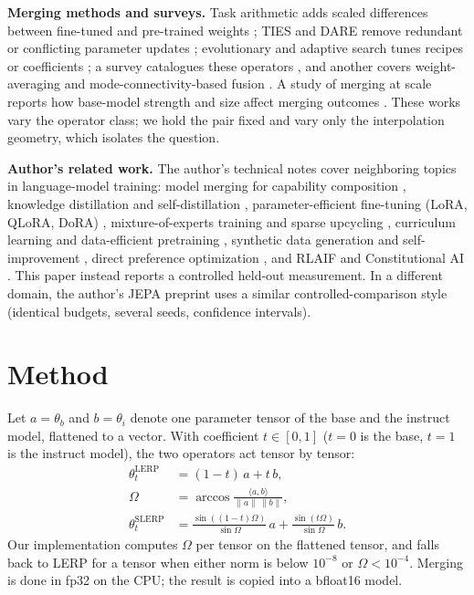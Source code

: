 \documentclass[conference]{IEEEtran}
\begin{document}
\textbf{Merging methods and surveys.} Task arithmetic adds scaled differences between fine-tuned and pre-trained weights \cite{ilharco2022editing}; TIES and DARE remove redundant or conflicting parameter updates \cite{yadav2023ties,yu2023dare}; evolutionary and adaptive search tunes recipes or coefficients \cite{akiba2024evolutionary}; a survey catalogues these operators \cite{yang2024survey}, and another covers weight-averaging and mode-connectivity-based fusion \cite{li2023fusion}. A study of merging at scale reports how base-model strength and size affect merging outcomes \cite{yadav2024matters}. These works vary the operator class; we hold the pair fixed and vary only the interpolation geometry, which isolates the question.

\textbf{Author's related work.} The author's technical notes cover neighboring topics in language-model training: model merging for capability composition \cite{santos2026modelmergingfo}, knowledge distillation and self-distillation \cite{santos2026knowledgedisti}, parameter-efficient fine-tuning (LoRA, QLoRA, DoRA) \cite{santos2026parametereffic}, mixture-of-experts training and sparse upcycling \cite{santos2026mixtureofexper}, curriculum learning and data-efficient pretraining \cite{santos2026curriculumlear}, synthetic data generation and self-improvement \cite{santos2026syntheticdatag}, direct preference optimization \cite{santos2026directpreferen}, and RLAIF and Constitutional AI \cite{santos2026rlaifandconsti}. This paper instead reports a controlled held-out measurement. In a different domain, the author's JEPA preprint \cite{santos2026collapseresist} uses a similar controlled-comparison style (identical budgets, several seeds, confidence intervals).

\section{Method}
Let $a=\theta_b$ and $b=\theta_i$ denote one parameter tensor of the base and the instruct model, flattened to a vector. With coefficient $t\in[0,1]$ ($t=0$ is the base, $t=1$ is the instruct model), the two operators act tensor by tensor:
\begin{align}
\theta^{\mathrm{LERP}}_t &= (1-t)\,a+t\,b, \label{eq:lerp}\\
\Omega &= \arccos\frac{\langle a,b\rangle}{\lVert a\rVert\,\lVert b\rVert}, \label{eq:angle}\\
\theta^{\mathrm{SLERP}}_t &= \frac{\sin((1-t)\Omega)}{\sin\Omega}\,a+\frac{\sin(t\Omega)}{\sin\Omega}\,b. \label{eq:slerp}
\end{align}
Our implementation computes $\Omega$ per tensor on the flattened tensor, and falls back to LERP for a tensor when either norm is below $10^{-8}$ or $\Omega<10^{-4}$. Merging is done in fp32 on the CPU; the result is copied into a bfloat16 model.
\end{document}
